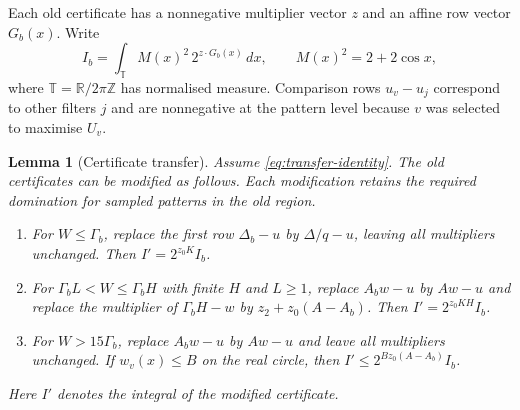 \documentclass[11pt,a4paper]{article}
\newtheorem{lemma}[theorem]{Lemma}
\theoremstyle{remark}
\newcommand{\Torus}{\mathbb{T}}
\begin{document}
Each old certificate has a nonnegative multiplier vector $z$ and
an affine row vector $G_b(x)$. Write
\[
 I_b=\int_{\Torus} M(x)^2\,2^{z\cdot G_b(x)}\,dx,
 \qquad M(x)^2=2+2\cos x,
\]
where $\Torus=\mathbb{R}/2\pi\mathbb{Z}$ has normalised measure. Comparison
rows $u_v-u_j$ correspond to other filters $j$ and are nonnegative at
the pattern level because $v$ was selected to maximise $U_v$.

\begin{lemma}[Certificate transfer]
\label{lem:transfer}
Assume \eqref{eq:transfer-identity}. The old certificates can be modified
as follows. Each modification retains the required domination for
sampled patterns in the old region.
\begin{enumerate}
\item For $W\le\Gamma_b$, replace the first row $\Delta_b-u$ by
      $\Delta/q-u$, leaving all multipliers unchanged. Then
      $I'=2^{z_0K}I_b$.
\item For $\Gamma_bL<W\le\Gamma_bH$ with finite $H$ and $L\ge1$,
      replace $A_bw-u$ by $Aw-u$ and replace the multiplier of
      $\Gamma_bH-w$ by $z_2+z_0(A-A_b)$. Then
      $I'=2^{z_0KH}I_b$.
\item For $W>15\Gamma_b$, replace $A_bw-u$ by $Aw-u$ and leave all
      multipliers unchanged. If $w_v(x)\le B$ on the real circle, then
      $I'\le2^{Bz_0(A-A_b)}I_b$.
\end{enumerate}
Here $I'$ denotes the integral of the modified certificate.
\end{lemma}
\end{document}
